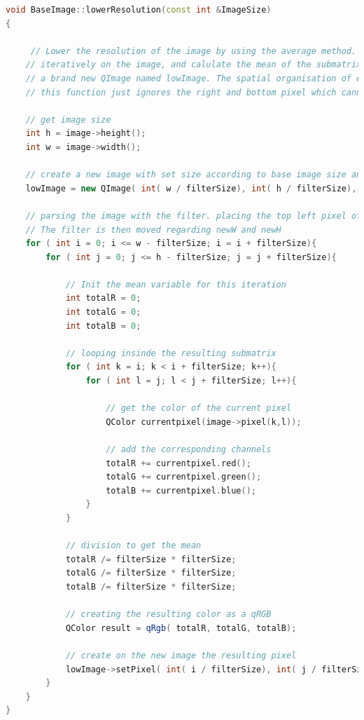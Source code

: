 \documentclass[aps,letterpaper,11pt]{revtex4}
\begin{document}
\begin{lstlisting}[language=C++]
void BaseImage::lowerResolution(const int &ImageSize)
{
    
     // Lower the resolution of the image by using the average method. The square defined by newH and newW will by applied
    // iteratively on the image, and calulate the mean of the submatrix below this filter. The result is then used to create a pixel in
    // a brand new QImage named lowImage. The spatial organisation of each pixel is kept. In order to fix the boundaries problem,
    // this function just ignores the right and bottom pixel which cannot fit in the filter.

    // get image size
    int h = image->height();
    int w = image->width();
    
    // create a new image with set size according to base image size and mask size
    lowImage = new QImage( int( w / filterSize), int( h / filterSize), QImage::Format_RGB32);
    
    // parsing the image with the filter. placing the top left pixel of the filter on the top left pixel of the image.
    // The filter is then moved regarding newW and newH
    for ( int i = 0; i <= w - filterSize; i = i + filterSize){
        for ( int j = 0; j <= h - filterSize; j = j + filterSize){
        
            // Init the mean variable for this iteration
            int totalR = 0;
            int totalG = 0;
            int totalB = 0;
            
            // looping insinde the resulting submatrix
            for ( int k = i; k < i + filterSize; k++){
                for ( int l = j; l < j + filterSize; l++){
                
                    // get the color of the current pixel
                    QColor currentpixel(image->pixel(k,l));
                    
                    // add the corresponding channels
                    totalR += currentpixel.red();
                    totalG += currentpixel.green();
                    totalB += currentpixel.blue();
                }
            }
            
            // division to get the mean
            totalR /= filterSize * filterSize;
            totalG /= filterSize * filterSize;
            totalB /= filterSize * filterSize;
            
            // creating the resulting color as a qRGB
            QColor result = qRgb( totalR, totalG, totalB);
            
            // create on the new image the resulting pixel
            lowImage->setPixel( int( i / filterSize), int( j / filterSize), result.rgb());
        }
    }
}
\end{lstlisting}
\end{document}
